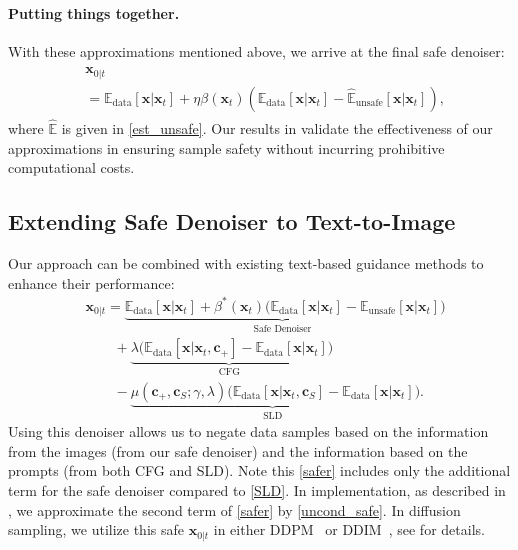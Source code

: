 %
%
%
%



\paragraph{Putting things together.}
With these approximations mentioned above, we arrive at the final safe denoiser:
\begin{align}\label{eq:uncond_safe}
\begin{split}
   &\mathbf{x}_{0\vert t} \\
   &= \mathbb{E}_{\text{data}}[\mathbf{x}\vert\mathbf{x}_{t}]
+ \eta\beta(\mathbf{x}_{t})(\mathbb{E}_{\text{data}}[\mathbf{x}\vert\mathbf{x}_{t}]-\hat{\mathbb{E}}_{\text{unsafe}}[\mathbf{x}\vert\mathbf{x}_{t}]),
\end{split}
\end{align}
where $\hat{\mathbb{E}}$ is given in \eqref{est_unsafe}. 
%
Our results in  validate the effectiveness of our approximations in ensuring sample safety without incurring prohibitive computational costs.
%

%

%
%
%
%
%
%



%
%
%
%
%
%

%

%

%

\subsection{Extending Safe Denoiser to Text-to-Image}

Our approach can be combined with existing text-based guidance methods to enhance their performance:
%
%
%
%
%
\begin{align}\label{eq:safer}
&\mathbf{x}_{0\vert t}=\underbrace{\mathbb{E}_{\text{data}}[\mathbf{x}\vert\mathbf{x}_{t}]
+ \beta^{*}(\mathbf{x}_{t})(\mathbb{E}_{\text{data}}[\mathbf{x}\vert\mathbf{x}_{t}]-\mathbb{E}_{\text{unsafe}}[\mathbf{x}\vert\mathbf{x}_{t}]}_{\text{Safe Denoiser}}) \nonumber \\
%
&\quad\quad+\underbrace{\lambda(\mathbb{E}_{\text{data}}[\mathbf{x}\vert\mathbf{x}_{t},\mathbf{c}_{+}]-\mathbb{E}_{\text{data}}[\mathbf{x}\vert\mathbf{x}_{t}]}_{\text{CFG}})\\
%
    &\quad\quad-\underbrace{\mu(\mathbf{c}_{+},\mathbf{c}_{S};\gamma,\lambda)(\mathbb{E}_{\text{data}}[\mathbf{x}\vert\mathbf{x}_{t},\mathbf{c}_{S}]-\mathbb{E}_{\text{data}}[\mathbf{x}\vert\mathbf{x}_{t}]}_{\text{SLD}}).\nonumber
\end{align}
Using this denoiser allows us to negate data samples based on the information from the images (from our safe denoiser) and the information based on the prompts (from both CFG and SLD). Note this \eqref{safer} includes only the additional term for the safe denoiser compared to \eqref{SLD}. In implementation, as described in , we approximate the second term of \eqref{safer} by \eqref{uncond_safe}. In diffusion sampling, we utilize this safe $\mathbf{x}_{0\vert t}$ in either DDPM~\cite{ho2020denoising} or DDIM~\cite{song2020denoising}, see  for details.

